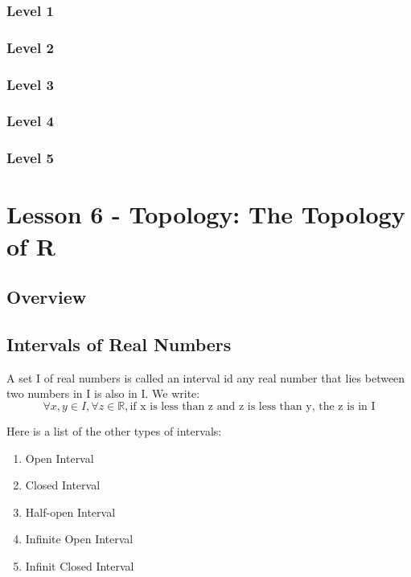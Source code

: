 \documentclass{article}
\begin{document}
\subsubsection{Level 1}
\subsubsection{Level 2}
\subsubsection{Level 3}
\subsubsection{Level 4}
\subsubsection{Level 5}
\pagebreak

\section{Lesson 6 - Topology: The Topology of R}

\subsection{Overview}

\subsection{Intervals of Real Numbers}

\begin{definition}[Interval]
    A set I of real numbers is called an interval id any real number that lies
    between two numbers in I is also in I. We write:
    $$ \forall x, y \in I, \forall z \in \mathbb{R}, \text{if x is less than z
    and z is less than y, the z is in I} $$

    Here is a list of the other types of intervals:
    \begin{enumerate}
	\item Open Interval
	\item Closed Interval
	\item Half-open Interval
	\item Infinite Open Interval
	\item Infinit Closed Interval
    \end{enumerate}

\end{definition}
\end{document}
